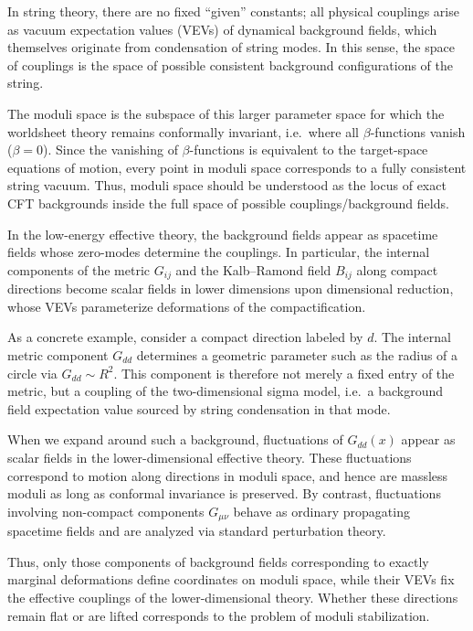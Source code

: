 \begin{tcolorbox}[breakable]
	\begin{remark}
In string theory, there are no fixed “given” constants; all physical couplings arise as vacuum expectation values (VEVs) of dynamical background fields, which themselves originate from condensation of string modes. In this sense, the space of couplings is the space of possible consistent background configurations of the string.

The moduli space is the subspace of this larger parameter space for which the worldsheet theory remains conformally invariant, i.e.\ where all $\beta$-functions vanish ($\beta=0$). Since the vanishing of $\beta$-functions is equivalent to the target-space equations of motion, every point in moduli space corresponds to a fully consistent string vacuum. Thus, moduli space should be understood as the locus of exact CFT backgrounds inside the full space of possible couplings/background fields.

In the low-energy effective theory, the background fields appear as spacetime fields whose zero-modes determine the couplings. In particular, the internal components of the metric $G_{ij}$ and the Kalb--Ramond field $B_{ij}$ along compact directions become scalar fields in lower dimensions upon dimensional reduction, whose VEVs parameterize deformations of the compactification.

As a concrete example, consider a compact direction labeled by $d$. The internal metric component $G_{dd}$ determines a geometric parameter such as the radius of a circle via $G_{dd} \sim R^2$. This component is therefore not merely a fixed entry of the metric, but a coupling of the two-dimensional sigma model, i.e.\ a background field expectation value sourced by string condensation in that mode.

When we expand around such a background, fluctuations of $G_{dd}(x)$ appear as scalar fields in the lower-dimensional effective theory. These fluctuations correspond to motion along directions in moduli space, and hence are massless moduli as long as conformal invariance is preserved. By contrast, fluctuations involving non-compact components $G_{\mu\nu}$ behave as ordinary propagating spacetime fields and are analyzed via standard perturbation theory.

Thus, only those components of background fields corresponding to exactly marginal deformations define coordinates on moduli space, while their VEVs fix the effective couplings of the lower-dimensional theory. Whether these directions remain flat or are lifted corresponds to the problem of moduli stabilization.
	\end{remark}
\end{tcolorbox}
